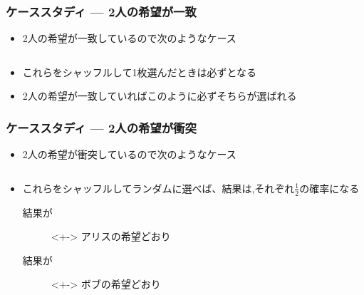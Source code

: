 \begin{frame}
  \frametitle{ケーススタディ --- 2人の希望が一致}

  \pause
  \begin{itemize}
    \item<+-> 2人の希望が一致しているので次のようなケース
      \begin{columns}
        \begin{column}{0.5\textwidth}
          \alicecallout{+}{\heartcard}
        \end{column}
        \begin{column}{0.5\textwidth}
          \bobcallout{-}{\heartcard}
        \end{column}
      \end{columns}

    \item<+-> これらをシャッフルして1枚選んだときは必ず\heartcard となる

    \item<+-> 2人の希望が一致していればこのように必ずそちらが選ばれる
  \end{itemize}
\end{frame}

\begin{frame}
  \frametitle{ケーススタディ --- 2人の希望が衝突}

  \begin{itemize}
    \item<+-> 2人の希望が衝突しているので次のようなケース
      \begin{columns}
        \begin{column}{0.5\textwidth}
          \alicecallout{+}{\heartcard}
        \end{column}
        \begin{column}{0.5\textwidth}
          \bobcallout{-}{\clubcard}
        \end{column}
      \end{columns}

    \item<+-> これらをシャッフルしてランダムに選べば、結果は\heartcard,\clubcard それぞれ$\frac{1}{2}$の確率になる
    \begin{description}
      \item[結果が\heartcard]<+-> アリスの希望どおり
      \item[結果が\clubcard]<+-> ボブの希望どおり
    \end{description}
  \end{itemize}
\end{frame}

